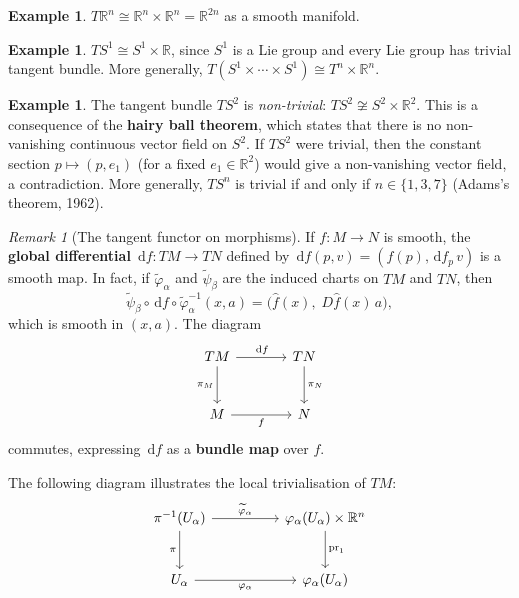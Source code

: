 \documentclass[12pt,a4paper,openany]{book}
\theoremstyle{definition}
\newtheorem{example}[theorem]{Example}
\theoremstyle{remark}
\newtheorem{remark}[theorem]{Remark}
\newcommand{\R}{\mathbb{R}}
\newcommand{\dd}{\,\mathrm{d}}
\begin{document}
\begin{example}\label{ex:tangent-bundle-Rn}
$T\R^n \cong \R^n \times \R^n = \R^{2n}$ as a smooth manifold.
\end{example}

\begin{example}\label{ex:tangent-bundle-S1}%
$TS^1 \cong S^1 \times \R$, since $S^1$ is a Lie group and every Lie
group has trivial tangent bundle.  More generally, $T(S^1 \times \cdots
\times S^1) \cong T^n \times \R^n$.
\end{example}

\begin{example}\label{ex:tangent-bundle-S2}%
The tangent bundle $TS^2$ is \emph{non-trivial}: $TS^2 \not\cong
S^2 \times \R^2$.  This is a consequence of the \textbf{hairy ball
theorem}, which states that there is no
non-vanishing continuous vector field on $S^2$.  If $TS^2$ were trivial,
then the constant section $p \mapsto (p, e_1)$ (for a fixed
$e_1 \in \R^2$) would give a non-vanishing vector field, a contradiction.
More generally, $TS^n$ is trivial if and only if $n \in \{1, 3, 7\}$
(Adams's theorem, 1962).
\end{example}

\begin{remark}[The tangent functor on morphisms]\label{rem:tangent-functor-maps}%
If $f \colon M \to N$ is smooth, the \textbf{global differential}
$\dd f \colon TM \to TN$ defined by $\dd f(p, v) = (f(p), \dd f_p\, v)$
is a smooth map.  In fact, if $\widetilde{\varphi}_\alpha$ and
$\widetilde{\psi}_\beta$ are the induced charts on $TM$ and $TN$, then
\[
  \widetilde{\psi}_\beta \circ \dd f \circ \widetilde{\varphi}_\alpha^{-1}
  (x, a) = \bigl(\hat{f}(x),\; D\hat{f}(x)\, a\bigr),
\]
which is smooth in $(x, a)$.  The diagram
\[
\begin{tikzcd}[column sep=large, row sep=large]
  TM \arrow[r, "\dd f"] \arrow[d, "\pi_M"'] &
  TN \arrow[d, "\pi_N"] \\
  M \arrow[r, "f"'] & N
\end{tikzcd}
\]
commutes, expressing $\dd f$ as a \textbf{bundle map}
over $f$.
\end{remark}

The following diagram illustrates the local trivialisation of $TM$:
\[
\begin{tikzcd}[column sep=huge, row sep=large]
  \pi^{-1}(U_\alpha)
    \arrow[r, "\widetilde{\varphi}_\alpha"]
    \arrow[d, "\pi"'] &
  \varphi_\alpha(U_\alpha) \times \R^n
    \arrow[d, "\mathrm{pr}_1"] \\
  U_\alpha \arrow[r, "\varphi_\alpha"'] &
  \varphi_\alpha(U_\alpha)
\end{tikzcd}
\]
\end{document}
